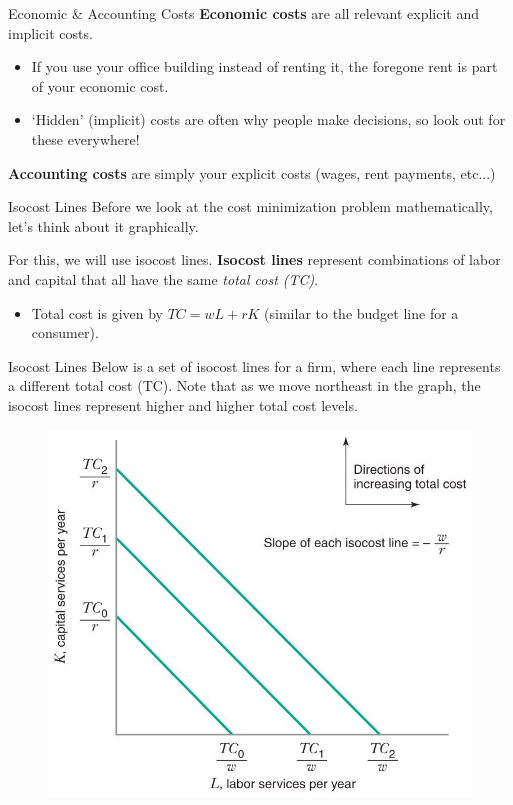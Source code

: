 \documentclass[11pt,t]{beamer}
\begin{document}
\begin{frame}{Economic \& Accounting Costs}
  \textbf{Economic costs} are all relevant explicit and implicit costs.

  \begin{itemize}
    \item If you use your office building instead of renting it, the foregone rent is part of your economic cost.
    
    \item `Hidden' (implicit) costs are often why people make decisions, so look out for these everywhere!
  \end{itemize}

  \bigskip
  \textbf{Accounting costs} are simply your explicit costs (wages, rent payments, etc...)
\end{frame}

\begin{frame}{Isocost Lines}
  Before we look at the cost minimization problem mathematically, let's think about it graphically.

  \bigskip
  For this, we will use isocost lines. \textbf{Isocost lines} represent combinations of labor and capital that all have the same \textit{total cost (TC)}.

  \bigskip  
  \begin{itemize}
    \item Total cost is given by $TC = wL + rK$ (similar to the budget line for a consumer).
  \end{itemize}
\end{frame}

\begin{frame}{Isocost Lines}
  Below is a set of isocost lines for a firm, where each line represents a different total cost (TC). Note that as we move northeast in the graph, the isocost lines represent higher and higher total cost levels.

  \begin{figure}
    \includegraphics[width=0.55\linewidth]{figures/fig7_1.jpg}
  \end{figure}
\end{frame}
\end{document}
